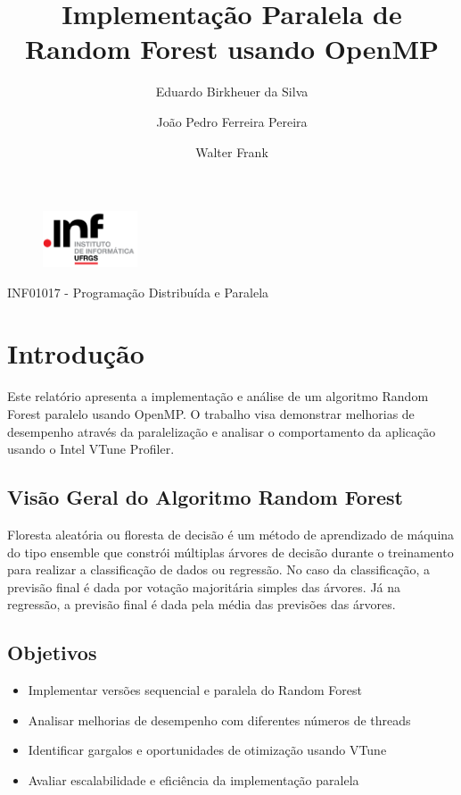 \documentclass[a4paper,11pt]{article}
\title{\textbf{Implementação Paralela de Random Forest usando OpenMP}}
\author{Eduardo Birkheuer da Silva \and João Pedro Ferreira Pereira \and Walter Frank}
\date{}
\begin{document}
\maketitle

\vspace{2cm}

\begin{figure}[H]
    \centering
    \includegraphics[width=0.25\textwidth]{inf_logo.png}
\end{figure}
\begin{center}
    INF01017 - Programação Distribuída e Paralela
\end{center}

\vspace{2cm}



\newpage
\tableofcontents
\newpage

\section{Introdução}

Este relatório apresenta a implementação e análise de um algoritmo Random Forest paralelo usando OpenMP. O trabalho visa demonstrar melhorias de desempenho através da paralelização e analisar o comportamento da aplicação usando o Intel VTune Profiler.

\subsection{Visão Geral do Algoritmo Random Forest}
Floresta aleatória ou floresta de decisão é um método de aprendizado de máquina do tipo ensemble que constrói múltiplas árvores de decisão durante o treinamento para realizar a classificação de dados ou regressão. No caso da classificação, a previsão final é dada por votação majoritária simples das árvores. Já na regressão, a previsão final é dada pela média das previsões das árvores.

\subsection{Objetivos}
\begin{itemize}
    \item Implementar versões sequencial e paralela do Random Forest
    \item Analisar melhorias de desempenho com diferentes números de threads
    \item Identificar gargalos e oportunidades de otimização usando VTune
    \item Avaliar escalabilidade e eficiência da implementação paralela
\end{itemize}
\end{document}
